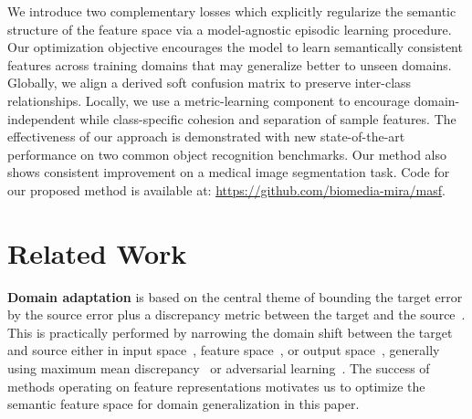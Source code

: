 \documentclass{article}
\begin{document}
We introduce two complementary losses which explicitly regularize the semantic structure of the feature space via a model-agnostic episodic learning procedure.
Our optimization objective encourages the model to learn semantically consistent features across training domains that may generalize better to unseen domains.
Globally, we align a derived soft confusion matrix to preserve inter-class relationships. Locally, we use a metric-learning component to encourage domain-independent while class-specific cohesion and separation of sample features.
The effectiveness of our approach is demonstrated with new state-of-the-art performance on two common object recognition benchmarks. Our method also shows consistent improvement on a medical image segmentation task.
Code for our proposed method is available at: \url{https://github.com/biomedia-mira/masf}.


 
\section{Related Work}
\label{sec:related}
\textbf{Domain adaptation} is based on the central theme of bounding the target error by the source error plus a discrepancy
metric between the target and the source~\citep{ben2010theory}. This is practically performed by narrowing the domain shift between the target and source either in input space~\citep{hoffman2018cycada}, feature space~\citep{kumar2010co,ganin2016domain,long2016unsupervised,saenko2010adapting,tzeng2017adversarial}, or output space~\citep{luo2018taking,saito2018maximum,tsai2018learning}, generally using maximum mean discrepancy~\citep{gretton2012optimal,sejdinovic2013equivalence} or adversarial learning~\citep{goodfellow2014generative}.
The success of methods operating on feature representations motivates us to optimize the semantic feature space for domain generalization in this paper.
\end{document}
